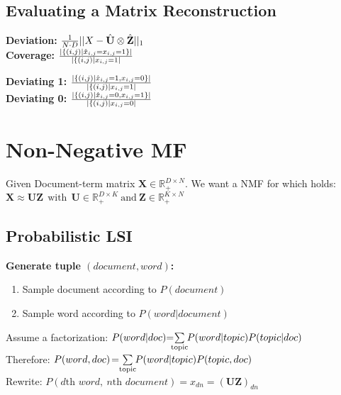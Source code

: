 \documentclass[a4paper,11pt]{article}
\newcommand{\R}{\mathbb{R}}
\newcommand{\msection}[1]{\section{#1}\vspace{-0.5mm}}
\begin{document}
\begin{multicols}{2}
\subsection{Evaluating a Matrix Reconstruction}
\begin{minipage}{0.46\columnwidth}
  \textbf{Deviation:} ${1\over N\cdot D} ||X-\hat{ \mathbf{U}} \otimes \hat{\mathbf Z} ||_1$\\
  \textbf{Coverage:} ${|\{(i,j)|\hat x_{i,j} = x_{i,j} = 1\}| \over |\{(i,j)|x_{i,j}=1|}$\\
\end{minipage}
\begin{minipage}{0.5\columnwidth}
  \textbf{Deviating 1:} ${|\{(i,j)|\hat x_{i,j} = 1, x_{i,j} = 0\}| \over |\{(i,j)|x_{i,j}=1|}$\\

  \textbf{Deviating 0:} ${|\{(i,j)|\hat x_{i,j} = 0, x_{i,j} = 1\}| \over |\{(i,j)|x_{i,j}=0|}$\\
\end{minipage}


\msection{Non-Negative MF}
Given Document-term matrix $\mathbf X\in \R_+^{D\times N}$. We want a NMF for which holds:\\
\vspace{-0.1cm}\hspace{2.5cm}
$\mathbf X \approx \mathbf{UZ} \ \ \text{with}\ \  \mathbf U\in \R_+^{D \times K}\ \text{and}\ \mathbf Z\in \R_+^{K\times N}$
\subsection{Probabilistic LSI}
\textbf{Generate tuple $(document, word)$:}
\begin{enumerate}[leftmargin=0.5cm]
  \itemsep0em 
  \item Sample document according to $P(document)$
  \item Sample word according to $P(word|document)$
\end{enumerate}
Assume a factorization: \hspace{-0.2cm}
$P(word|doc) \hspace{-0.1cm} = \hspace{-0.2cm} \sum\limits_{\text{topic}} \hspace{-0.1cm} P(word|topic)P(topic|doc)$\\
Therefore: \hspace{1.6cm}$P(word, doc) \hspace{-0.05cm} = \hspace{-0.1cm} \sum\limits_{\text{topic}} \hspace{-0.1cm}  P(word|topic)P(topic, doc)$\\
Rewrite: \hspace{1.8cm}$P(d\text{th } word,\ n\text{th } document) = x_{dn} = (\mathbf{UZ})_{dn}$\\
  

\end{multicols}
\end{document}
